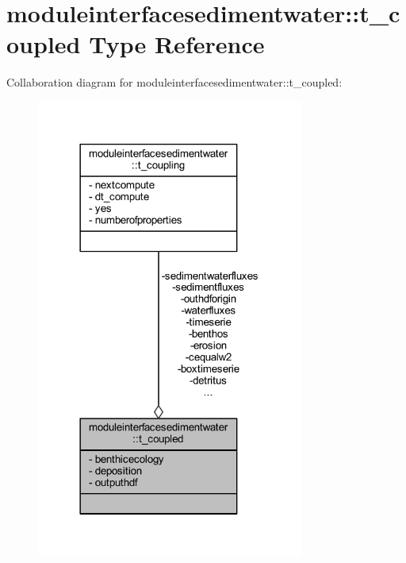 \hypertarget{structmoduleinterfacesedimentwater_1_1t__coupled}{}\section{moduleinterfacesedimentwater\+:\+:t\+\_\+coupled Type Reference}
\label{structmoduleinterfacesedimentwater_1_1t__coupled}


Collaboration diagram for moduleinterfacesedimentwater\+:\+:t\+\_\+coupled\+:\nopagebreak
\begin{figure}[H]
\begin{center}
\leavevmode
\includegraphics[width=249pt]{structmoduleinterfacesedimentwater_1_1t__coupled__coll__graph}
\end{center}
\end{figure}
